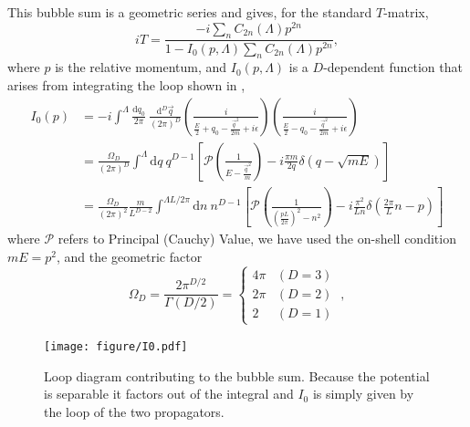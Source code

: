 This bubble sum is a geometric series and gives, for the standard $T$-matrix, \cite{Kaplan:1998we,Beane:2003da}
\begin{equation}\label{eq:T matrix}
iT = \frac{-i\sum_n C_{2n}(\Lambda) p^{2n}}{1-I_0(p,\Lambda) \sum_n C_{2n}(\Lambda) p^{2n}},
\end{equation}
where $p$ is the relative momentum,  and $I_0(p,\Lambda)$ is a $D$-dependent function that arises from integrating the loop shown in ,
\begin{align}
    I_0(p)
    &=-i\int^{\Lambda}
        \frac { \mathrm {d}q_0}{2\pi}\ \frac{\mathrm { d } ^ { D } \vec{ q } } { (2\pi)^ { D } }
        \left( \frac { i } { \frac{E}{2} + q _ { 0 } - \frac{\vec{q}^2}{2m} + i \epsilon } \right)
        \left( \frac { i } { \frac{E}{2} - q _ { 0 } - \frac{\vec{q}^2}{2m} + i \epsilon } \right)
    \nonumber\\
    &=\frac{\Omega_D}{(2\pi)^D}\int^{\Lambda}  \mathrm { d } q \ q^{D-1}\left[\mathcal{P} \left( \frac { 1 } { E - \frac{\vec{q}^2}{m} } \right)
-i\frac{\pi m}{2q}\delta(q-\sqrt{mE})\right]
    \\
    &=\frac{\Omega_D}{(2\pi)^2}\frac{m}{L^{D-2}}\int^{\Lambda L/2\pi}  \mathrm { d } n \ n^{D-1}\left[\mathcal{P} \left( \frac { 1 } { \left(\frac{pL}{2\pi}\right)^2 - n^2 } \right)
-i\frac{\pi^2}{L n}\delta\left(\frac{2\pi}{L}n -p\right)\right]
    \label{eq:I0}
\end{align}
where $\mathcal{P}$ refers to Principal (Cauchy) Value, we have used the on-shell condition $mE=p^2$, and the geometric factor
\begin{equation}
\Omega_D=\frac{2\pi^{D/2}}{\Gamma(D/2)}=
    \begin{cases}
        4\pi    &   (D=3)\\
        2\pi    &   (D=2)\\
        2       &   (D=1)
    \end{cases}\ ,
\end{equation}

\begin{figure}[h!]
    \center
    \texttt{[image: figure/I0.pdf]}
    \caption{
        Loop diagram contributing to the bubble sum.
        Because the potential is separable it factors out of the integral and $I_0$ is simply given by the loop of the two propagators.
    }
    \label{fig:I0}
\end{figure}

